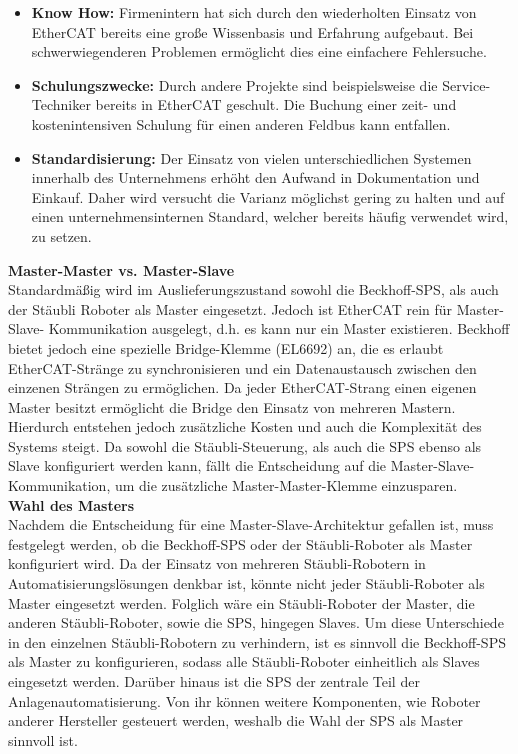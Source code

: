 \documentclass[ a4paper,
                oneside,
                toc=bibliography,
                toc=listof
                ]{scrbook}
\begin{document}
	\begin{itemize}
		\item \textbf{Know How: } Firmenintern hat sich durch den wiederholten Einsatz von EtherCAT bereits eine große Wissenbasis und Erfahrung aufgebaut. Bei schwerwiegenderen Problemen ermöglicht dies eine einfachere Fehlersuche.
		\item \textbf{Schulungszwecke: } Durch andere Projekte sind beispielsweise die Service-Techniker bereits in EtherCAT geschult. Die Buchung einer zeit- und kostenintensiven Schulung für einen anderen Feldbus kann entfallen.
		\item \textbf{Standardisierung:} Der Einsatz von vielen unterschiedlichen Systemen innerhalb des Unternehmens erhöht den Aufwand in Dokumentation und Einkauf. Daher wird versucht die Varianz möglichst gering zu halten und auf einen unternehmensinternen Standard, welcher bereits häufig verwendet wird, zu setzen.\\
	\end{itemize}
	\clearpage
	\noindent
	\textbf{Master-Master vs. Master-Slave}\\
	Standardmäßig wird im Auslieferungszustand sowohl die Beckhoff-SPS, als auch der Stäubli Roboter als Master eingesetzt.	Jedoch ist EtherCAT rein für Master-Slave- Kommunikation ausgelegt, d.h. es kann nur ein Master existieren. \cite{ethercat}	Beckhoff bietet jedoch eine spezielle Bridge-Klemme (EL6692) an, die es erlaubt EtherCAT-Stränge zu synchronisieren und ein Datenaustausch zwischen den einzenen Strängen zu ermöglichen. Da jeder EtherCAT-Strang einen eigenen Master besitzt ermöglicht die Bridge den Einsatz von mehreren Mastern. \cite{Bridge} Hierdurch entstehen jedoch zusätzliche Kosten und auch die Komplexität des Systems steigt. Da sowohl die Stäubli-Steuerung, als auch die SPS ebenso als Slave konfiguriert werden kann, fällt die Entscheidung auf die Master-Slave-Kommunikation, um die zusätzliche Master-Master-Klemme einzusparen.\vspace{0.5\baselineskip}\\
	\textbf{Wahl des Masters} \\
	Nachdem die Entscheidung für eine Master-Slave-Architektur gefallen ist, muss festgelegt werden, ob die Beckhoff-SPS oder der Stäubli-Roboter als Master konfiguriert wird. Da der Einsatz von mehreren Stäubli-Robotern in Automatisierungslösungen denkbar ist, könnte nicht jeder Stäubli-Roboter als Master eingesetzt werden. Folglich wäre ein Stäubli-Roboter der Master, die anderen Stäubli-Roboter, sowie die SPS, hingegen Slaves. Um diese Unterschiede in den einzelnen Stäubli-Robotern zu verhindern, ist es sinnvoll die Beckhoff-SPS als Master zu konfigurieren, sodass alle Stäubli-Roboter einheitlich als Slaves eingesetzt werden. Darüber hinaus ist die SPS der zentrale Teil der Anlagenautomatisierung. Von ihr können weitere Komponenten, wie Roboter anderer Hersteller gesteuert werden, weshalb die Wahl der SPS als Master sinnvoll ist.\\
\end{document}
